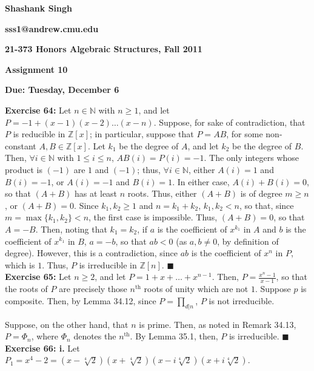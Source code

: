 \documentclass{article}
\begin{document}
\begin{center}
\textbf{Shashank Singh}

\textbf{sss1@andrew.cmu.edu}

\textbf{21-373 \quad Honors Algebraic Structures, Fall 2011}

\textbf{Assignment 10}

\textbf{Due: Tuesday, December 6}\\
\end{center}

\textbf{Exercise 64:} Let $n \in \mathbb{N}$ with $n \geq 1$, and let
$P = -1 + (x - 1)(x - 2)\ldots(x-n)$. Suppose, for sake of contradiction,
that $P$ is reducible in $\mathbb{Z}[x]$; in particular, suppose that
$P = AB$, for some non-constant $A,B \in \mathbb{Z}[x]$. Let $k_1$ be the
degree of $A$, and let $k_2$ be the degree of $B$. Then, $\forall i
\in \mathbb{N}$ with $1 \leq i \leq n$, $AB(i) = P(i) = -1$. The only integers
whose product is $(-1)$ are $1$ and $(-1)$; thus, $\forall i \in \mathbb{N}$,
either $A(i) = 1$ and $B(i) = -1$, or $A(i) = -1$ and $B(i) = 1$. In either
case, $A(i) + B(i) = 0$, so that $(A + B)$ has at least $n$ roots. Thus,
either $(A + B)$ is of degree $m \geq n$, or $(A + B) = 0$. Since $k_1,
k_2 \geq 1$ and $n = k_1 + k_2$, $k_1, k_2 < n$, so that, since
$m = \max \{k_1, k_2\} < n$, the first case is impossible. Thus,
$(A + B) = 0$, so that $A = -B$. Then, noting that $k_1 = k_2$, if $a$ is the
coefficient of $x^{k_1}$ in $A$ and $b$ is the coefficient of $x^{k_1}$ in
$B$, $a = -b$, so that $ab < 0$ (as $a,b \neq 0$, by definition of degree).
However, this is a contradiction, since $ab$ is the coefficient of $x^n$
in $P$, which is $1$. Thus, $P$ is irreducible in $\mathbb{Z}[n]$.
\qquad $\blacksquare$ \\

\textbf{Exercise 65:} Let $n \geq 2$, and let $P = 1 + x + \ldots + x^{n - 1}$.
Then, $P = \frac{x^n - 1}{x - 1}$, so that the roots of $P$ are precisely those
$n^{\mbox{th}}$ roots of unity which are not $1$. Suppose $p$ is composite.
Then, by Lemma 34.12, since $P = \prod_{d | n}$, $P$ is not irreducible.

Suppose, on the other hand, that $n$ is prime. Then, as noted in Remark 34.13,
$P = \Phi_n$, where $\Phi_n$ denotes the $n^{\mbox{th}}$. By Lemma 35.1, then,
$P$ is irreducible. \qquad $\blacksquare$ \\

\textbf{Exercise 66: i.} Let $P_1 = x^4 - 2 =
                                                (x - \sqrt[4]{2})
                                                (x + \sqrt[4]{2})
                                                (x - i\sqrt[4]{2})
                                                (x + i\sqrt[4]{2})$.
\end{document}
